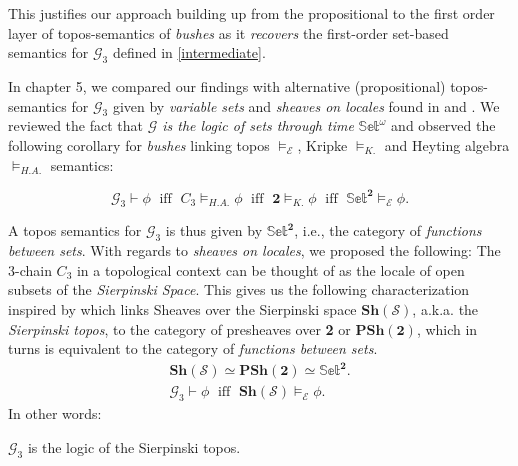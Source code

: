 \begin{remark}
	This justifies our approach building up from the propositional to the first order layer of topos-semantics of \emph{bushes} as it \emph{recovers} the first-order set-based semantics for $\mathcal{G}_3$ defined in \ref{intermediate}.
\end{remark}
	 
In chapter 5,  we compared our findings with alternative (propositional) topos-semantics for $\mathcal{G}_3$ given by \emph{variable sets} and \emph{sheaves on locales} found in \cite{goldblatt} and \cite{lisboa}. \newline
We reviewed the fact that \emph{$\mathcal{G}$ is the logic of sets through time} $\mathbb{Set}^\textbf{$\omega$}$ and observed the following corollary for \emph{bushes} linking  topos $ \models_{\mathcal{E}}$, Kripke $ \models_{K.}$ and Heyting algebra $\models_{H.A.}$ semantics:
\begin{cor*}
	\begin{equation*}
		\mathcal{G}_3 \vdash \phi\; \text{ iff } \; C_{3} \models_{H.A.} \phi \; \text{ iff } \; \textbf{2} \models_{K.} \phi
		\; \text{ iff } \; \mathbb{Set}^\textbf{2} \models_{\mathcal{E}} \phi.
	\end{equation*}
\end{cor*}
A topos semantics for $\mathcal{G}_3$ is thus given by $\mathbb{Set}^\textbf{2}$, i.e., the category of \emph{functions between sets}. \newline
With regards to \emph{sheaves on locales}, we proposed the following:\newline
The 3-chain $C_3$ in a topological context can be thought of as the locale of open subsets of the \emph{Sierpinski Space}.\newline
This gives us the following characterization inspired by  \cite{elephant}  which links Sheaves over the Sierpinski space $\textbf{Sh}(\mathcal{S})$, a.k.a. the \emph{Sierpinski topos}, to the category of presheaves over \textbf{2} or $\textbf{PSh}(\textbf{2})$, which in turns is equivalent to the category of \emph{functions between sets}.
\begin{gather*}
	\textbf{Sh}(\mathcal{S}) \simeq \textbf{PSh}(\textbf{2}) \simeq \mathbb{Set}^{\textbf{2}}. \\
	\mathcal{G}_{3} \vdash \phi \;\text{ iff }\;\mathbf{Sh}(\mathcal{S}) \models_{\mathcal{E}} \phi.
\end{gather*}
In other words:   
\begin{prop}
	$\mathcal{G}_3$  is the logic of the Sierpinski topos.
\end{prop}

